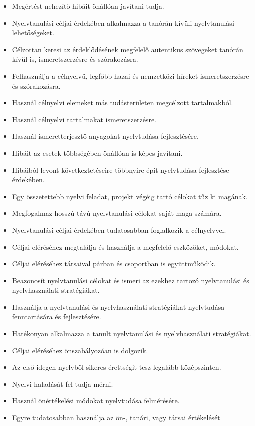 \begin{itemize}
\item
  Megértést nehezítő hibáit önállóan javítani tudja.
\item
  Nyelvtanulási céljai érdekében alkalmazza a tanórán kívüli
  nyelvtanulási lehetőségeket.
\item
  Célzottan keresi az érdeklődésének megfelelő autentikus szövegeket
  tanórán kívül is, ismeretszerzésre és szórakozásra.
\item
  Felhasználja a célnyelvű, legfőbb hazai és nemzetközi híreket
  ismeretszerzésre és szórakozásra.
\item
  Használ célnyelvi elemeket más tudásterületen megcélzott tartalmakból.
\item
  Használ célnyelvi tartalmakat ismeretszerzésre.
\item
  Használ ismeretterjesztő anyagokat nyelvtudása fejlesztésére.
\item
  Hibáit az esetek többségében önállóan is képes javítani.
\item
  Hibáiból levont következtetéseire többnyire épít nyelvtudása
  fejlesztése érdekében.
\item
  Egy összetettebb nyelvi feladat, projekt végéig tartó célokat tűz ki
  magának.
\item
  Megfogalmaz hosszú távú nyelvtanulási célokat saját maga számára.
\item
  Nyelvtanulási céljai érdekében tudatosabban foglalkozik a célnyelvvel.
\item
  Céljai eléréséhez megtalálja és használja a megfelelő eszközöket,
  módokat.
\item
  Céljai eléréséhez társaival párban és csoportban is együttműködik.
\item
  Beazonosít nyelvtanulási célokat és ismeri az ezekhez tartozó
  nyelvtanulási és nyelvhasználati stratégiákat.
\item
  Használja a nyelvtanulási és nyelvhasználati stratégiákat nyelvtudása
  fenntartására és fejlesztésére.
\item
  Hatékonyan alkalmazza a tanult nyelvtanulási és nyelvhasználati
  stratégiákat.
\item
  Céljai eléréséhez önszabályozóan is dolgozik.
\item
  Az első idegen nyelvből sikeres érettségit tesz legalább középszinten.
\item
  Nyelvi haladását fel tudja mérni.
\item
  Használ önértékelési módokat nyelvtudása felmérésére.
\item
  Egyre tudatosabban használja az ön-, tanári, vagy társai értékelését

\end{itemize}
